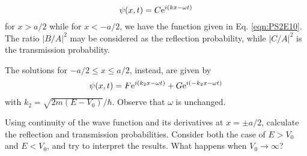 \documentclass[../psets.tex]{subfiles}
\begin{document}
\begin{enumerate}
    \begin{equation}
        \psi(x,t) = C\e[i(kx-\omega t)]
    \end{equation}
    for $x>a/2$ while for $x<-a/2$, we have the function given in Eq. \ref{eqn:PS2E10}. The ratio $|B/A|^2$ may be considered as the reflection probability, while $|C/A|^2$ is the transmission probability.\par
    The solutions for $-a/2\leq x\leq a/2$, instead, are given by
    \begin{equation}
        \psi(x,t) = F\e[i(k_2x-\omega t)]+G\e[i(-k_2x-\omega t)]
    \end{equation}
    with $k_2=\sqrt{2m(E-V_0)}/\hbar$. Observe that $\omega$ is unchanged.\par
    Using continuity of the wave function and its derivatives at $x=\pm a/2$, calculate the reflection and transmission probabilities. Consider both the case of $E>V_0$ and $E<V_0$, and try to interpret the results. What happens when $V_0\to\infty$?
\end{enumerate}
\end{document}

